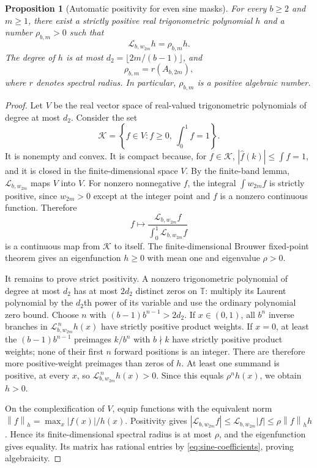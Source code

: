 \documentclass[11pt,a4paper]{article}
\newtheorem{proposition}[theorem]{Proposition}
\theoremstyle{definition}
\theoremstyle{remark}
\newcommand{\T}{\mathbb T}
\newcommand{\Lop}{\mathcal L}
\newcommand{\norm}[1]{\left\lVert#1\right\rVert}
\numberwithin{equation}{section}
\begin{document}
\begin{proposition}[Automatic positivity for even sine masks]
\label{prop:sine-positive}
For every $b\ge2$ and $m\ge1$, there exist a strictly positive real
trigonometric polynomial $h$ and a number $\rho_{b,m}>0$ such that
\begin{equation}
 \Lop_{b,w_{2m}}h=\rho_{b,m}h.
 \label{eq:sine-positive}
\end{equation}
The degree of $h$ is at most $d_2=\lfloor2m/(b-1)\rfloor$, and
\begin{equation}
 \rho_{b,m}=r(A_{b,2m}),
 \label{eq:rho-finite}
\end{equation}
where $r$ denotes spectral radius. In particular, $\rho_{b,m}$ is a
positive algebraic number.
\end{proposition}
\begin{proof}
Let $V$ be the real vector space of real-valued trigonometric polynomials
of degree at most $d_2$. Consider the set
\[
 \mathcal K=\left\{f\in V:f\ge0,\ \int_0^1f=1\right\}.
\]
It is nonempty and convex. It is compact because, for $f\in\mathcal K$,
$|\widehat f(k)|\le\int f=1$, and it is closed in the finite-dimensional
space $V$. By the finite-band lemma, $\Lop_{b,w_{2m}}$ maps $V$ into $V$.
For nonzero nonnegative $f$, the integral
$\int w_{2m}f$ is strictly positive, since $w_{2m}>0$ except at the integer
point and $f$ is a nonzero continuous function. Therefore
\[
 f\longmapsto
 \frac{\Lop_{b,w_{2m}}f}{\int_0^1\Lop_{b,w_{2m}}f}
\]
is a continuous map from $\mathcal K$ to itself. The finite-dimensional
Brouwer fixed-point theorem gives an eigenfunction $h\ge0$ with mean one
and eigenvalue $\rho>0$.

It remains to prove strict positivity. A nonzero trigonometric polynomial
of degree at most $d_2$ has at most $2d_2$ distinct zeros on $\T$: multiply
its Laurent polynomial by the $d_2$th power of its variable and use the
ordinary polynomial zero bound. Choose $n$ with
$(b-1)b^{n-1}>2d_2$. If $x\in(0,1)$, all $b^n$ inverse branches in
$\Lop_{b,w_{2m}}^{\,n}h(x)$ have strictly positive product weights.
If $x=0$, at least the $(b-1)b^{n-1}$ preimages $k/b^n$ with $b\nmid k$
have strictly positive product weights; none of their first $n$ forward
positions is an integer. There are therefore more positive-weight
preimages than zeros of $h$. At least one summand is positive, at every
$x$, so $\Lop_{b,w_{2m}}^{\,n}h(x)>0$. Since this equals $\rho^nh(x)$,
we obtain $h>0$.

On the complexification of $V$, equip functions with the equivalent norm
$\norm f_h=\max_x|f(x)|/h(x)$. Positivity gives
$|\Lop_{b,w_{2m}}f|\le\Lop_{b,w_{2m}}|f|\le\rho\norm f_h h$.
Hence its finite-dimensional spectral radius is at most $\rho$, and the
eigenfunction gives equality. Its matrix has rational entries by
\eqref{eq:sine-coefficients}, proving algebraicity.
\end{proof}
\end{document}
